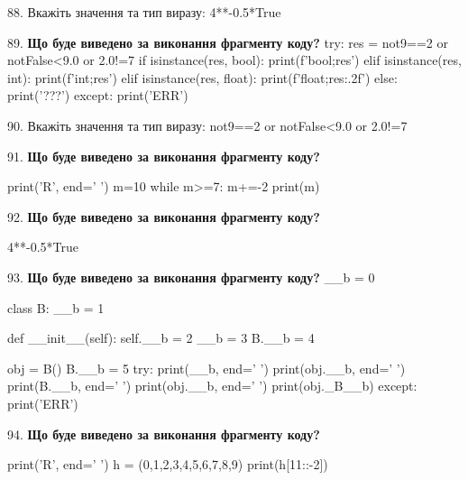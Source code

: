 \documentclass[11pt]{article}
\begin{document}
\par\vspace{5mm}
88. 
Вкажіть значення та тип виразу:
4**-0.5*True
\par\vspace{5mm}
89. \textbf{Що буде виведено за виконання фрагменту коду?}
try:
    res = not9==2 or notFalse<9.0 or 2.0!=7
    if isinstance(res, bool):
        print(f'bool;{res}')
    elif isinstance(res, int):
        print(f'int;{res}')
    elif isinstance(res, float):
        print(f'float;{res:.2f}')
    else:
        print('???')
except:
    print('ERR')
\par\vspace{5mm}
90. 
Вкажіть значення та тип виразу:
not9==2 or notFalse<9.0 or 2.0!=7
\par\vspace{5mm}
91. \textbf{Що буде виведено за виконання фрагменту коду?}

print('R', end=' ')
m=10
while m>=7:
    m+=-2
print(m)

\par\vspace{5mm}
92. \textbf{Що буде виведено за виконання фрагменту коду?}

4**-0.5*True
\par\vspace{5mm}
93. \textbf{Що буде виведено за виконання фрагменту коду?}
__b = 0

class B:
    __b = 1
    
    def __init__(self):
        self.__b = 2
        __b = 3
        B.__b = 4

obj = B()
B.__b = 5
try:
    print(__b, end=' ')
    print(obj.__b, end=' ')
    print(B.__b, end=' ')
    print(obj.__b, end=' ')
    print(obj._B__b)
except:
    print('ERR')
\par\vspace{5mm}
94. \textbf{Що буде виведено за виконання фрагменту коду?}

print('R', end=' ')
h = (0,1,2,3,4,5,6,7,8,9)
print(h[11::-2])
\end{document}
